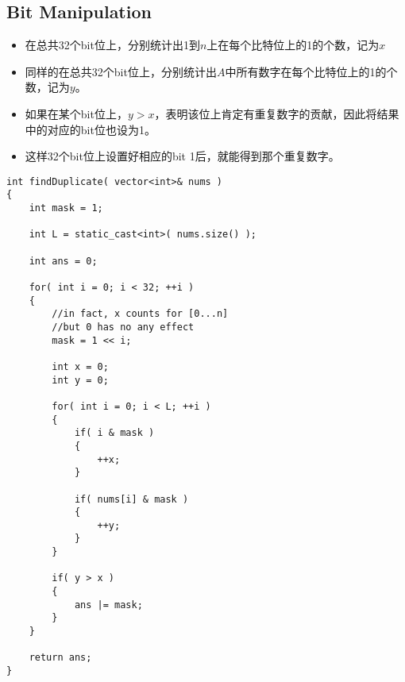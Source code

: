 \subsection{Bit Manipulation}
\begin{itemize}
\item 在总共32个bit位上，分别统计出1到$n$上在每个比特位上的1的个数，记为$x$
\item 同样的在总共32个bit位上，分别统计出$A$中所有数字在每个比特位上的1的个数，记为$y$。
\item 如果在某个bit位上，$y>x$，表明该位上肯定有重复数字的贡献，因此将结果中的对应的bit位也设为1。
\item 这样32个bit位上设置好相应的bit 1后，就能得到那个重复数字。
\end{itemize}
\setcounter{lstlisting}{0}
\begin{lstlisting}[style=customc, caption={Bit Manipulation}]
int findDuplicate( vector<int>& nums )
{
    int mask = 1;

    int L = static_cast<int>( nums.size() );

    int ans = 0;

    for( int i = 0; i < 32; ++i )
    {
        //in fact, x counts for [0...n]
        //but 0 has no any effect
        mask = 1 << i;

        int x = 0;
        int y = 0;

        for( int i = 0; i < L; ++i )
        {
            if( i & mask )
            {
                ++x;
            }

            if( nums[i] & mask )
            {
                ++y;
            }
        }

        if( y > x )
        {
            ans |= mask;
        }
    }

    return ans;
}
\end{lstlisting}